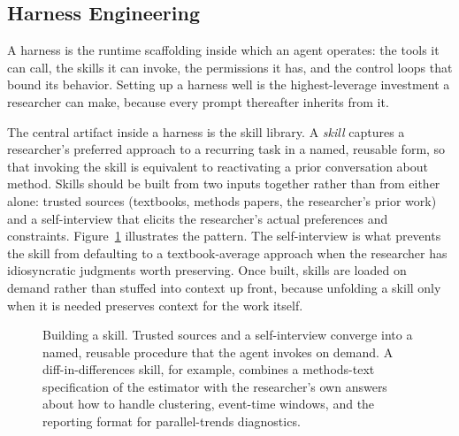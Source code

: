 \documentclass[11pt]{article}
\begin{document}
\subsection{Harness Engineering}
\label{sec:deploy-harness}

A harness is the runtime scaffolding inside which an agent operates: the tools it can call, the skills it can invoke, the permissions it has, and the control loops that bound its behavior. Setting up a harness well is the highest-leverage investment a researcher can make, because every prompt thereafter inherits from it.

The central artifact inside a harness is the skill library. A \emph{skill} captures a researcher's preferred approach to a recurring task in a named, reusable form, so that invoking the skill is equivalent to reactivating a prior conversation about method. Skills should be built from two inputs together rather than from either alone: trusted sources (textbooks, methods papers, the researcher's prior work) and a self-interview that elicits the researcher's actual preferences and constraints. Figure~\ref{fig:skill-build} illustrates the pattern. The self-interview is what prevents the skill from defaulting to a textbook-average approach when the researcher has idiosyncratic judgments worth preserving. Once built, skills are loaded on demand rather than stuffed into context up front, because unfolding a skill only when it is needed preserves context for the work itself.

\begin{figure}[t]
  \centering
  \caption{Building a skill. Trusted sources and a self-interview converge into a named, reusable procedure that the agent invokes on demand. A diff-in-differences skill, for example, combines a methods-text specification of the estimator with the researcher's own answers about how to handle clustering, event-time windows, and the reporting format for parallel-trends diagnostics.}
  \label{fig:skill-build}
\end{figure}
\end{document}
